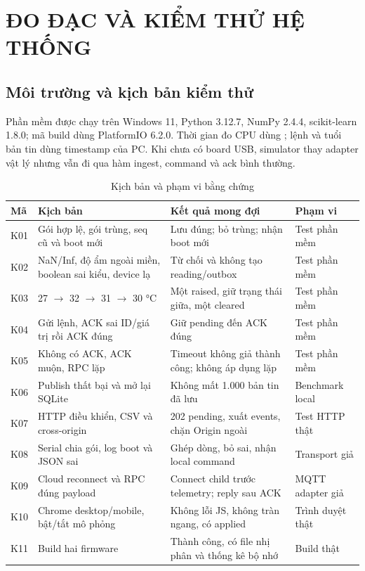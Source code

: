 \chapter{ĐO ĐẠC VÀ KIỂM THỬ HỆ THỐNG}
\section{Môi trường và kịch bản kiểm thử}
Phần mềm được chạy trên Windows 11, Python 3.12.7, NumPy 2.4.4, scikit-learn 1.8.0; mã build dùng PlatformIO 6.2.0. Thời gian đo CPU dùng ; lệnh và tuổi bản tin dùng timestamp của PC. Khi chưa có board USB, simulator thay adapter vật lý nhưng vẫn đi qua hàm ingest, command và ack bình thường.

\begin{longtable}{P{1.1cm}P{6.5cm}P{4.2cm}P{2.8cm}}
\caption{Kịch bản và phạm vi bằng chứng}\\
\toprule Mã & Kịch bản & Kết quả mong đợi & Phạm vi \\ \midrule
K01 & Gói hợp lệ, gói trùng, seq cũ và boot mới & Lưu đúng; bỏ trùng; nhận boot mới & Test phần mềm \\
K02 & NaN/Inf, độ ẩm ngoài miền, boolean sai kiểu, device lạ & Từ chối và không tạo reading/outbox & Test phần mềm \\
K03 & 27 $\rightarrow$ 32 $\rightarrow$ 31 $\rightarrow$ 30 °C & Một raised, giữ trạng thái giữa, một cleared & Test phần mềm \\
K04 & Gửi lệnh, ACK sai ID/giá trị rồi ACK đúng & Giữ pending đến ACK đúng & Test phần mềm \\
K05 & Không có ACK, ACK muộn, RPC lặp & Timeout không giả thành công; không áp dụng lặp & Test phần mềm \\
K06 & Publish thất bại và mở lại SQLite & Không mất 1.000 bản tin đã lưu & Benchmark local \\
K07 & HTTP điều khiển, CSV và cross-origin & 202 pending, xuất events, chặn Origin ngoài & Test HTTP thật \\
K08 & Serial chia gói, log boot và JSON sai & Ghép dòng, bỏ sai, nhận local command & Transport giả \\
K09 & Cloud reconnect và RPC đúng payload & Connect child trước telemetry; reply sau ACK & MQTT adapter giả \\
K10 & Chrome desktop/mobile, bật/tắt mô phỏng & Không lỗi JS, không tràn ngang, có applied & Trình duyệt thật \\
K11 & Build hai firmware & Thành công, có file nhị phân và thống kê bộ nhớ & Build thật \\

\end{longtable}
